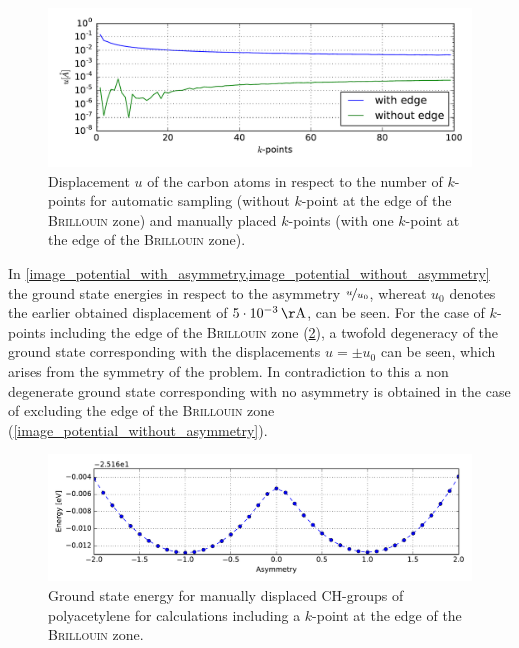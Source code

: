 \begin{figure}
	\centering
	\includegraphics[width = 13cm]{Images/polyacetylene/convergence/polyacetylene_displacement}
	\caption{Displacement $u$ of the carbon atoms in respect to the number of $k$-points for automatic sampling (without $k$-point at the edge of the \textsc{Brillouin} zone) and manually placed $k$-points (with one $k$-point at the edge of the \textsc{Brillouin} zone).}
	\label{image_k_point_sampling_assymetry}
\end{figure}
In \cref{image_potential_with_asymmetry,image_potential_without_asymmetry} the ground state energies in respect to the asymmetry $\nicefrac{u}{u_0}$, whereat $u_0$ denotes the earlier obtained displacement of  $\unit[5\cdot10^{-3}]{\AA}$, can be seen. For the case of $k$-points including the edge of the \textsc{Brillouin} zone (\cref{image_potential_with_asymmetry}), a twofold degeneracy of the ground state corresponding with the displacements $u = \pm u_0$ can be seen, which arises from the symmetry of the problem. In contradiction to this a non degenerate ground state corresponding with no asymmetry is obtained in the case of excluding the edge of the \textsc{Brillouin} zone (\cref{image_potential_without_asymmetry}).\\
\begin{figure}
	\centering
	\includegraphics[width = 13cm]{Images/polyacetylene/convergence/Potential_with_asymmetry}
	\caption{Ground state energy for manually displaced CH-groups of polyacetylene for calculations including a $k$-point at the edge of the \textsc{Brillouin} zone.}
	\label{image_potential_with_asymmetry}
\end{figure}
